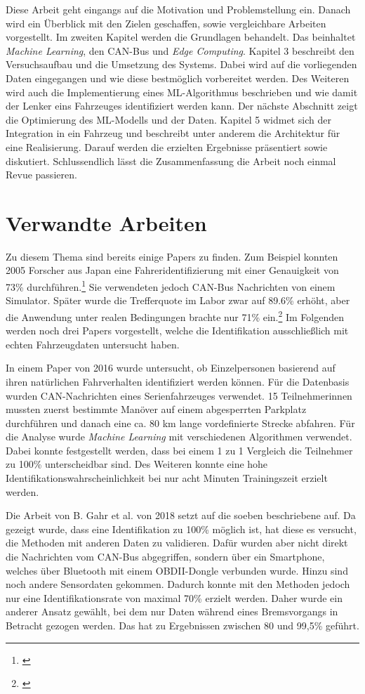 Diese Arbeit geht eingangs auf die Motivation und Problemstellung ein. Danach wird ein Überblick mit den Zielen geschaffen, sowie vergleichbare Arbeiten vorgestellt. Im zweiten Kapitel werden die Grundlagen behandelt. Das beinhaltet \textit{Machine Learning}, den CAN-Bus und \textit{Edge Computing}. Kapitel 3 beschreibt den Versuchsaufbau und die Umsetzung des Systems. Dabei wird auf die vorliegenden Daten eingegangen und wie diese bestmöglich vorbereitet werden. Des Weiteren wird auch die Implementierung eines ML-Algorithmus beschrieben und wie damit der Lenker eins Fahrzeuges identifiziert werden kann. Der nächste Abschnitt zeigt die Optimierung des ML-Modells und der Daten. Kapitel 5 widmet sich der Integration in ein Fahrzeug und beschreibt unter anderem die Architektur für eine Realisierung. Darauf werden die erzielten Ergebnisse präsentiert sowie diskutiert. Schlussendlich lässt die Zusammenfassung die Arbeit noch einmal Revue passieren.

\section{Verwandte Arbeiten}
\label{sec:related_work}

Zu diesem Thema sind bereits einige Papers zu finden. Zum Beispiel konnten 2005 Forscher aus Japan eine Fahreridentifizierung mit einer Genauigkeit von 73\% durchführen.\footnote{\cite{Wakita2005}} Sie verwendeten jedoch CAN-Bus Nachrichten von einem Simulator. Später wurde die Trefferquote im Labor zwar auf 89.6\% erhöht, aber die Anwendung unter realen Bedingungen brachte nur 71\% ein.\footnote{\cite{Miyajima2007}} Im Folgenden werden noch drei Papers vorgestellt, welche die Identifikation ausschließlich mit echten Fahrzeugdaten untersucht haben.

In einem Paper von 2016 \cite{Enev2016} wurde untersucht, ob Einzelpersonen basierend auf ihren natürlichen Fahrverhalten identifiziert werden können. Für die Datenbasis wurden CAN-Nachrichten eines Serienfahrzeuges verwendet. 15 Teilnehmerinnen mussten zuerst bestimmte Manöver auf einem abgesperrten Parkplatz durchführen und danach eine ca. 80 km lange vordefinierte Strecke abfahren. Für die Analyse wurde \textit{Machine Learning} mit verschiedenen Algorithmen verwendet. Dabei konnte festgestellt werden, dass bei einem 1 zu 1 Vergleich die Teilnehmer zu 100\% unterscheidbar sind. Des Weiteren konnte eine hohe Identifikationswahrscheinlichkeit bei nur acht Minuten Trainingszeit erzielt werden.

Die Arbeit von B. Gahr et al. von 2018 \cite{Gahr2018} setzt auf die soeben beschriebene auf. Da gezeigt wurde, dass eine Identifikation zu 100\% möglich ist, hat diese es versucht, die Methoden mit anderen Daten zu validieren. Dafür wurden aber nicht direkt die Nachrichten vom CAN-Bus abgegriffen, sondern über ein Smartphone, welches über Bluetooth mit einem OBDII-Dongle verbunden wurde. Hinzu sind noch andere Sensordaten gekommen. Dadurch konnte mit den Methoden jedoch nur eine Identifikationsrate von maximal 70\% erzielt werden. Daher wurde ein anderer Ansatz gewählt, bei dem nur Daten während eines Bremsvorgangs in Betracht gezogen werden. Das hat zu Ergebnissen zwischen 80 und 99,5\% geführt.

